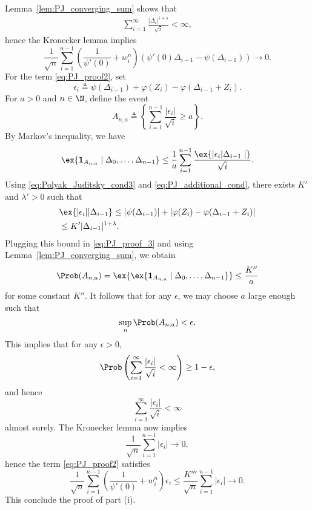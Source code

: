 Lemma~\ref{lem:PJ_converging_sum} shows that 
\begin{align}
\sum_{i=1}^\infty \frac{|\Delta_i|^{1+\lambda}}{\sqrt{i}}  < \infty \label{eq:PJ_converging_sum},
\end{align}
hence the Kronecker lemma implies
\[
\frac{1}{\sqrt{n}} \sum_{i=1}^{n-1} \left( \frac{1}{\psi'(0)}  + w_i^n \right)  \left( \psi'(0) \Delta_{i-1}  - \psi(\Delta_{i-1}) \right) \to 0.
\]
For the term \eqref{eq:PJ_proof2}, set 
\[
\epsilon_i \triangleq \psi(\Delta_{i-1}) + \varphi(Z_i) - \varphi(\Delta_{i-1}+Z_i).
\]
For $a>0$ and $n \in \N$, define the event
\[
A_{n,a} \triangleq \left\{ \sum_{i=1}^{n-1} \frac{|\epsilon_i|}{\sqrt{i}}  \geq a  \right\}. 
\]
By Markov's inequality, we have
\begin{align}
\ex{\mathbf 1_{A_{n,a}}   \mid \Delta_0,\ldots,\Delta_{n-1} } \leq \frac{1}{a} \sum_{i=1}^{n-1} \frac{ \ex{|\epsilon_i| \Delta_{i-1} \mid }}{\sqrt{i}}. \label{eq:PJ_proof_3}
\end{align}
Using \eqref{eq:Polyak_Juditsky_cond3} and \eqref{eq:PJ_additional_cond}, there exists $K'$ and $\lambda'>0$ such that
\begin{align*}
& \ex{ |\epsilon_i| | \Delta_{i-1}}  \leq |\psi(\Delta_{i-1})| + \left| \varphi(Z_i) - \varphi(\Delta_{i-1}+Z_i) \right|  \\
& \leq K' |\Delta_{i-1}|^{1+\lambda}. 
\end{align*}
Plugging this bound in \eqref{eq:PJ_proof_3} and using Lemma~\ref{lem:PJ_converging_sum}, we obtain 
\[
\Prob(A_{n,a}) = \ex{ \ex{\mathbf 1_{A_{n,a}}   \mid \Delta_0,\ldots,\Delta_{n-1} } } \leq  \frac{K''}{a}
\]
for some constant $K''$. It follows that for any $\epsilon$, we may choose $a$ large enough such that 
\[
\sup_{n} \Prob(A_{n,a}) < \epsilon.
\]
This implies that for any $\epsilon>0$,
\[
\Prob \left( \sum_{i=1}^\infty \frac{|\epsilon_i|}{\sqrt{i}} < \infty \right) \geq 1-\epsilon,
\]
and hence 
\[
\sum_{i=1}^\infty \frac{|\epsilon_i|}{\sqrt{i}} < \infty
\]
almost surely. The Kronecker lemma now implies 
\[
\frac{1}{\sqrt{n}} \sum_{i=1}^{n-1} \left|\epsilon_i\right| \to 0,
\]
hence the term \eqref{eq:PJ_proof2} satisfies
\[
\frac{1}{\sqrt{n}} \sum_{i=1}^{n-1} \left( \frac{1}{\psi'(0)}  + w_i^n \right) \epsilon_i \leq \frac{K'''}{\sqrt{n}} \sum_{i=1}^{n-1} |\epsilon_i| \to 0. 
\]
This conclude the proof of part (i).

